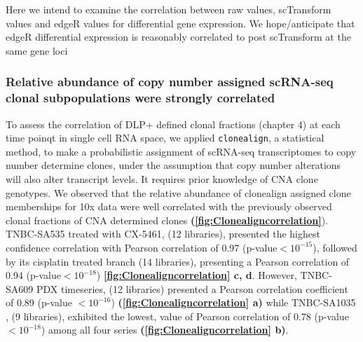 Here we intend to examine the correlation between raw values, scTransform values and edgeR values for differential gene expression. We hope/anticipate that edgeR differential expression is reasonably correlated to post scTransform at the same gene loci





 




\subsubsection{Relative abundance of copy number assigned scRNA-seq clonal subpopulations were strongly correlated}
 
 To assess the correlation of DLP+ defined clonal fractions (chapter 4) at each time poinqt in single cell RNA space, we applied \texttt{clonealign}, a statistical method, \cite{campbell2019clonealign} to make a probabilistic assignment of scRNA-seq transcriptomes to copy number determine clones, under the assumption that copy number alterations will also alter transcript levels. It requires prior knowledge of CNA clone genotypes.
 We observed that the relative abundance of clonealign assigned clone memberships for 10x data were well correlated with the previously observed clonal fractions of CNA determined clones \textbf{(\autoref{fig:Clonealigncorrelation}}). TNBC-SA535 treated with CX-5461, (12 libraries), presented the highest confidence correlation with Pearson correlation of 0.97 (p-value$< 10^{-15}$), followed by its cisplatin treated branch (14 libraries), presenting a Pearson correlation of 0.94 (p-value$< 10^{-18}$) \textbf{\autoref{fig:Clonealigncorrelation} c, d}. However, TNBC-SA609 PDX timeseries, (12 libraries) presented a Pearson correlation coefficient of 0.89 (p-value $< 10^{-16}$) \textbf{(\autoref{fig:Clonealigncorrelation} a)} while TNBC-SA1035 , (9 libraries), exhibited the lowest, value of Pearson correlation of 0.78 (p-value$< 10^{-18}$) among all four series \textbf{(\autoref{fig:Clonealigncorrelation} b)}.
  
